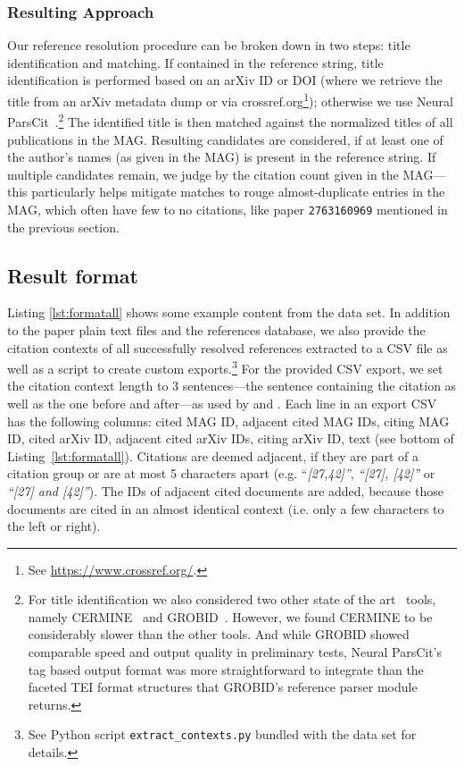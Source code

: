 \subsubsection{Resulting Approach}
Our reference resolution procedure can be broken down in two steps: title identification and matching. If contained in the reference string, title identification is performed based on an arXiv ID or DOI (where we retrieve the title from an arXiv metadata dump or via crossref.org\footnote{See \url{https://www.crossref.org/}.}); otherwise we use Neural ParsCit~\cite{Animesh2018}.\footnote{For title identification we also considered two other state of the art~\cite{Tkaczyk2018} tools, namely  CERMINE~\cite{Tkaczyk2015} and GROBID~\cite{Lopez2009}. However, we found CERMINE to be considerably slower than the other tools. And while GROBID showed comparable speed and output quality in preliminary tests, Neural ParsCit's tag based output format was more straightforward to integrate than the faceted TEI format structures that GROBID's reference parser module returns.}
The identified title is then matched against the normalized titles of all publications in the MAG. Resulting candidates are considered, if at least one of the author's names (as given in the MAG) is present in the reference string. If multiple candidates remain, we judge by the citation count given in the MAG---this particularly helps mitigate matches to rouge almost-duplicate entries in the MAG, which often have few to no citations, like paper \texttt{2763160969} mentioned in the previous section.

\subsection{Result format}
Listing \ref{lst:formatall} shows some example content from the data set. In addition to the paper plain text files and the references database, we also provide the citation contexts of all successfully resolved references extracted to a CSV file as well as a script to create custom exports.\footnote{See Python script \texttt{extract\_contexts.py} bundled with the data set for details.} For the provided CSV export, we set the citation context length to 3 sentences---the sentence containing the citation as well as the one before and after---as used by \cite{Tang2014fixed} and \cite{Huang2015fixed}. Each line in an export CSV has the following columns: cited MAG ID, adjacent cited MAG IDs, citing MAG ID, cited arXiv ID, adjacent cited arXiv IDs, citing arXiv ID, text (see bottom of Listing~\ref{lst:formatall}). Citations are deemed adjacent, if they are part of a citation group or are at most 5 characters apart (e.g. ``\emph{[27,42]''}, \emph{``[27], [42]''} or \emph{``[27] and [42]''}). The IDs of adjacent cited documents are added, because those documents are cited in an almost identical context (i.e. only a few characters to the left or right).

